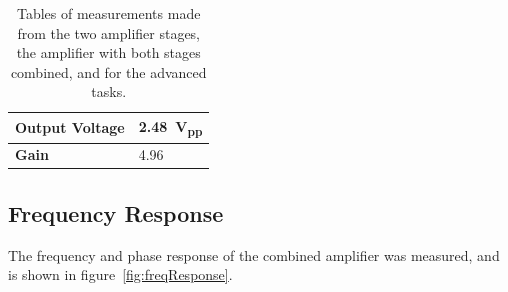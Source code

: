 \documentclass[a4paper,11pt]{article}
\begin{document}
\begin{table}[h]
{\begin{tabular}{|l|l|}
                \textbf{Output Voltage} & \SI{2.48}{\volt_{pp}}         \\ \hline
                \textbf{Gain}           & 4.96                          \\ \hline
            \end{tabular}
            \label{tab:scombgain}
        }
        \qquad
        \caption{Tables of measurements made from the two amplifier stages, the amplifier with both stages combined, and for the advanced tasks.}
        \label{tab:gain}
    \end{table}
        
    \subsection{Frequency Response}
        The frequency and phase response of the combined amplifier was measured, and is shown in figure~\ref{fig:freqResponse}.
        
\end{document}

